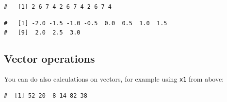 \documentclass[a4paper,9pt,twocolumn,twoside,printwatermark=false]{pinp}
\begin{document}
\begin{ShadedResult}
\begin{verbatim}
#   [1] 2 6 7 4 2 6 7 4 2 6 7 4
\end{verbatim}
\end{ShadedResult}

\begin{Shaded}
\begin{Highlighting}[]
\StringTok{ }\NormalTok{(}\OperatorTok{-}\NormalTok{, }\NormalTok{, }\NormalTok{)}
\end{Highlighting}
\end{Shaded}

\begin{ShadedResult}
\begin{verbatim}
#   [1] -2.0 -1.5 -1.0 -0.5  0.0  0.5  1.0  1.5
#   [9]  2.0  2.5  3.0
\end{verbatim}
\end{ShadedResult}

\subsection{Vector operations}\label{vector-operations}

You can do also calculations on vectors, for example using \texttt{x1}
from above:

\begin{Shaded}
\begin{Highlighting}[]
\OperatorTok{*}\StringTok{ }
\end{Highlighting}
\end{Shaded}

\begin{ShadedResult}
\begin{verbatim}
#  [1] 52 20  8 14 82 38
\end{verbatim}
\end{ShadedResult}

\begin{Shaded}
\begin{Highlighting}[]
\NormalTok{(}\OperatorTok{*}\NormalTok{), }\NormalTok{)}
\end{Highlighting}
\end{Shaded}
\end{document}
